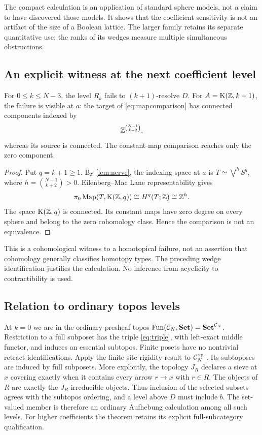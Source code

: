The compact calculation is an application of standard sphere models,
not a claim to have discovered those models. It shows that the
coefficient sensitivity is not an artifact of the size of a Boolean
lattice. The larger family retains its separate quantitative use:
the ranks of its wedges measure multiple simultaneous obstructions.

\subsection{An explicit witness at the next coefficient level}

\begin{proposition}\label{prop:witness}
For $0\leq k\leq N-3$, the level $R_k$ fails to $(k+1)$-resolve $D$.
For $A=\mathrm K(\mathbb Z,k+1)$, the failure is visible at $a$: the target of
\eqref{eq:mapcomparison} has connected components indexed by
\begin{equation}\label{eq:componentwitness}
\mathbb Z^{\binom{N-1}{k+2}},
\end{equation}
whereas its source is connected. The constant-map comparison reaches only
the zero component.
\end{proposition}

\begin{proof}
Put $q=k+1\geq1$. By \cref{lem:nerve}, the indexing space at $a$ is
$T\simeq\bigvee^h S^q$, where $h=\binom{N-1}{k+2}>0$.
Eilenberg--Mac Lane representability gives
\[
\pi_0\operatorname{Map}(T,\mathrm K(\mathbb Z,q))\cong H^q(T;\mathbb Z)\cong\mathbb Z^h.
\]
The space $\mathrm K(\mathbb Z,q)$ is connected. Its constant maps have zero degree
on every sphere and belong to the zero cohomology class. Hence the
comparison is not an equivalence.
\end{proof}

This is a cohomological witness to a homotopical failure, not an assertion
that cohomology generally classifies homotopy types. The preceding wedge
identification justifies the calculation. No inference from acyclicity to
contractibility is used.

\subsection{Relation to ordinary topos levels}

At $k=0$ we are in the ordinary presheaf topos
$\operatorname{Fun}(\mathcal C_N,\mathbf{Set})=\mathbf{Set}^{\mathcal C_N}$. Restriction to a full subposet
has the triple \eqref{eq:triple}, with left-exact middle functor, and induces
an essential subtopos. Finite posets have no nontrivial retract identifications. Apply the
finite-site rigidity result to $\mathcal C_N^{\mathrm{op}}$
\cite{Marques}. Its subtoposes are induced by full subposets. More
explicitly, the topology $J_R$ declares a sieve at $x$ covering exactly
when it contains every arrow $r\to x$ with $r\in R$. The objects of
$R$ are exactly the $J_R$-irreducible objects. Thus inclusion of the
selected subsets agrees with the subtopos ordering, and a level above
$D$ must include $b$. The set-valued member is therefore an ordinary
Aufhebung calculation among all such levels. For higher coefficients
the theorem retains its explicit full-subcategory qualification.

